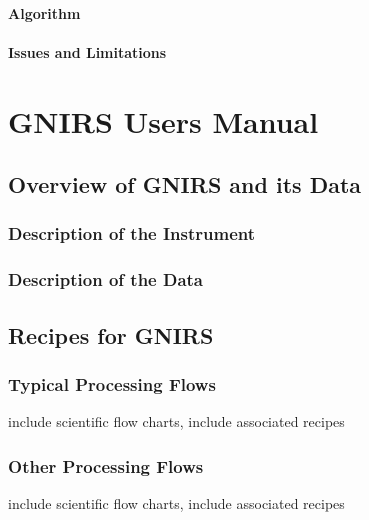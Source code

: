 \documentclass[letterpaper,10pt,english]{sphinxmanual}
\begin{document}
\subsubsection{Algorithm}
\label{GMOS/primitives_pages/primitive2:algorithm}

\subsubsection{Issues and Limitations}
\label{GMOS/primitives_pages/primitive2:issues-and-limitations}

\chapter{GNIRS Users Manual}
\label{GNIRScontents:id1}\label{GNIRScontents::doc}\label{GNIRScontents:gnirs-users-manual}

\section{Overview of GNIRS and its Data}
\label{GNIRS/instrument::doc}\label{GNIRS/instrument:overview-of-gnirs-and-its-data}\label{GNIRS/instrument:gnirs-instrument-overview}

\subsection{Description of the Instrument}
\label{GNIRS/instrument:description-of-the-instrument}

\subsection{Description of the Data}
\label{GNIRS/instrument:description-of-the-data}

\section{Recipes for GNIRS}
\label{GNIRS/recipes:gnirs-recipes-and-flows}\label{GNIRS/recipes:recipes-for-gnirs}\label{GNIRS/recipes::doc}

\subsection{Typical Processing Flows}
\label{GNIRS/recipes:typical-processing-flows}
include scientific flow charts, include associated recipes


\subsection{Other Processing Flows}
\label{GNIRS/recipes:other-processing-flows}
include scientific flow charts, include associated recipes
\end{document}
